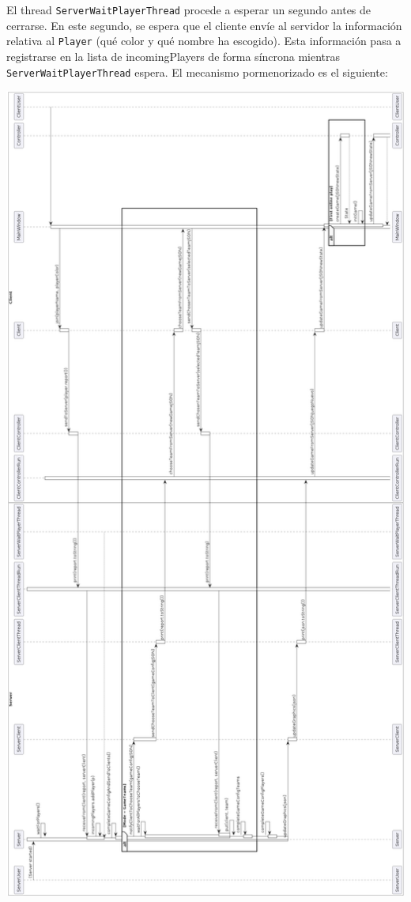 \documentclass[12pt,a4paper,openright]{book}
\theoremstyle{break}
\begin{document}
El thread \texttt{ServerWaitPlayerThread} procede a esperar un segundo antes de cerrarse. En este segundo, se espera que el cliente envíe al servidor la información relativa al \texttt{Player} (qué color y qué nombre ha escogido). Esta información pasa a registrarse en la lista de incomingPlayers de forma síncrona mientras \texttt{ServerWaitPlayerThread} espera. El mecanismo pormenorizado es el siguiente:

\begin{center}
\includegraphics[scale=0.4]{empezarPartidaUmlSprint7.png}
\end{center}
\end{document}
